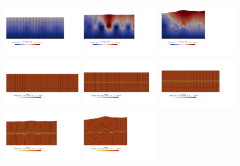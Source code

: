 \begin{center}
\includegraphics[width=3.4cm]{python_codes/fieldstone_129/results/experiment1/vel0199}
\includegraphics[width=3.4cm]{python_codes/fieldstone_129/results/experiment1/vel0299}
\includegraphics[width=3.4cm]{python_codes/fieldstone_129/results/experiment1/vel0399}\\
\includegraphics[width=3.4cm]{python_codes/fieldstone_129/results/experiment1/sigmam0000}
\includegraphics[width=3.4cm]{python_codes/fieldstone_129/results/experiment1/sigmam0099}
\includegraphics[width=3.4cm]{python_codes/fieldstone_129/results/experiment1/sigmam0199}
\includegraphics[width=3.4cm]{python_codes/fieldstone_129/results/experiment1/sigmam0299}
\includegraphics[width=3.4cm]{python_codes/fieldstone_129/results/experiment1/sigmam0399}\\
\end{center}


